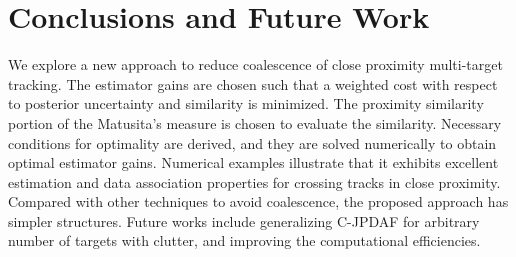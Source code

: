\documentclass[letterpaper, 10pt, conference]{ieeeconf}
\begin{document}


\section{Conclusions and Future Work}
\label{ConclusionFutureWork}
We explore a new approach to reduce coalescence of close proximity multi-target tracking. The estimator gains are chosen such that a weighted cost with respect to posterior uncertainty and similarity is minimized. The proximity similarity portion of the Matusita's measure is chosen to evaluate the similarity. Necessary conditions for optimality are derived, and they are solved numerically to obtain optimal estimator gains. Numerical examples illustrate that it exhibits excellent estimation and data association properties for crossing tracks in close proximity. Compared with other techniques to avoid coalescence, the proposed approach has simpler structures. Future works include generalizing C-JPDAF for arbitrary number of targets with clutter, and improving the computational efficiencies. 

\end{document}
